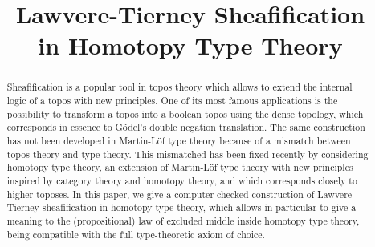 \documentclass[conference]{IEEEtran}
\begin{document}
%
\title{Lawvere-Tierney Sheafification\\ in Homotopy Type Theory}


\author{
}



\maketitle

\begin{abstract}

  Sheafification is a popular tool in topos theory which
  allows to extend the internal logic of a topos with new
  principles. One of its most famous applications is the possibility
  to transform a topos into a boolean topos using the
  dense topology, which corresponds in essence to Gödel's double
  negation translation.
  The same construction has not been developed in Martin-Löf type
  theory because of a mismatch between topos theory and type theory. This
  mismatched has been fixed recently by considering homotopy type
  theory, an extension of Martin-Löf type theory with new
  principles inspired by category theory and homotopy theory, and
  which corresponds closely to higher toposes.
  In this paper, we give a computer-checked construction of
  Lawvere-Tierney sheafification in homotopy type theory, which allows
  in particular to give a meaning to the (propositional) law of
  excluded middle inside homotopy type theory, being
  compatible with the full type-theoretic axiom of choice.
  
\end{abstract}
\end{document}
